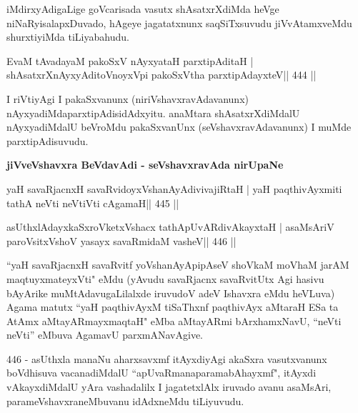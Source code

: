 \begin{artha}
iMdirxyAdigaLige goVcarisada vasutx shAsatxrXdiMda heVge niNaRyisalapxDuvado, hAgeye jagatatxnunx saqSiTxsuvudu jiVvAtamxveMdu shurxtiyiMda tiLiyabahudu.
\end{artha}


\begin{shl}
EvaM tAvadayaM pakoSxV nAyxyataH parxtipAditaH |
shAsatxrXnAyxyAditoV\s noyxV\s pi pakoSxV\s tha parxtipAdayxteV\hfill || 444 ||
\end{shl}

\begin{artha}
I riVtiyAgi I pakaSxvanunx (niriVshavxravAdavanunx) nAyxyadiMda\break parxtipAdisidAdxyitu. anaMtara shAsatxrXdiMdalU nAyxyadiMdalU beVroMdu pakaSxvanUnx (seVshavxravAdavanunx) I muMde parxtipAdisuvudu.
\end{artha}

\medskip
\centerline{\Large{\textbf{jiVveVshavxra BeVdavAdi - seVshavxravAda nirUpaNe}}}

\medskip


\begin{shl}
yaH savaRjacnxH savaRvidoyxV\s shanAyAdivivajiRtaH |
yaH paqthivAyxmiti tathA neVti neVtiVti cA\s\s gamaH\hfill || 445 ||
\end{shl}

\begin{shl}
asUthxlAdayxkaSxroVketxVshacx tathA\s pUvARdivAkayxtaH |
asaMsAriV paroV\s sitxVshoV yasayx savaRmidaM vasheV\hfill || 446 ||
\end{shl}

\begin{artha}
``yaH savaRjacnxH savaRvitf yoV\s shanAyApipAseV shoVkaM moVhaM
jarAM maqtuyxmateyxVti" eMdu (yAvudu savaRjacnx savaRvitUtx Agi
hasivu bAyArike muMtAdavugaLilalxde iruvudoV adeV Ishavxra eMdu
heVLuva) Agama matutx ``yaH paqthivAyxM tiSaThxnf paqthivAyx aMtaraH
\mdash \mdash \mdash  ESa ta AtAmx aMtayARmayxmaqtaH" eMba
aMtayARmi bArxhamxNavU, ``neVti neVti'' eMbuva AgamavU
parxmANavAgive. 

446 - asUthxla manaNu aharxsavxmf itAyxdiyAgi akaSxra
vasutxvanunx boVdhisuva vacanadiMdalU ``apUvaRmanaparamabAhayxmf", 
itAyxdi vAkayxdiMdalU yAra vashadalilx I jagatetxlAlx
iruvado avanu asaMsAri, parameVshavxraneMbuvanu idAdxneMdu tiLiyuvudu.
\end{artha}

